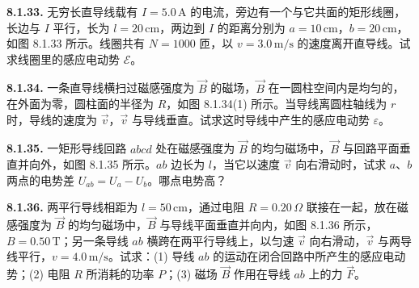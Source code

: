 \begin{center}
\end{center}

\vfill
\newpage

\textbf{8.1.33.} 无穷长直导线载有 $I = 5.0\,\mathrm{A}$ 的电流，旁边有一个与它共面的矩形线圈，长边与 $I$ 平行，长为 $l = 20\,\mathrm{cm}$，两边到 $I$ 的距离分别为 $a = 10\,\mathrm{cm}$，$b = 20\,\mathrm{cm}$，如图 8.1.33 所示。线圈共有 $N = 1000$ 匝，以 $v = 3.0\,\mathrm{m/s}$ 的速度离开直导线。试求线圈里的感应电动势 $\mathcal{E}$。

\begin{center}
\end{center}

\vfill
\newpage

\textbf{8.1.34.} 一条直导线横扫过磁感强度为 $\vec{B}$ 的磁场，$\vec{B}$ 在一圆柱空间内是均匀的，在外面为零，圆柱面的半径为 $R$，如图 8.1.34(1) 所示。当导线离圆柱轴线为 $r$ 时，导线的速度为 $\vec{v}$，$\vec{v}$ 与导线垂直。试求这时导线中产生的感应电动势 $\varepsilon$。

\begin{center}
\end{center}

\vfill
\newpage

\textbf{8.1.35.} 一矩形导线回路 $abcd$ 处在磁感强度为 $\vec{B}$ 的均匀磁场中，$\vec{B}$ 与回路平面垂直并向外，如图 8.1.35 所示。$ab$ 边长为 $l$，当它以速度 $\vec{v}$ 向右滑动时，试求 $a$、$b$ 两点的电势差 $U_{ab} = U_{a} - U_{b}$。哪点电势高？

\begin{center}
\end{center}

\vfill
\newpage

\textbf{8.1.36.} 两平行导线相距为 $l = 50\,\mathrm{cm}$，通过电阻 $R = 0.20\,\Omega$ 联接在一起，放在磁感强度为 $\vec{B}$ 的均匀磁场中，$\vec{B}$ 与导线平面垂直并向内，如图 8.1.36 所示，$B = 0.50\,\mathrm{T}$；另一条导线 $ab$ 横跨在两平行导线上，以匀速 $\vec{v}$ 向右滑动，$\vec{v}$ 与两导线平行，$v = 4.0\,\mathrm{m/s}$。试求：(1) 导线 $ab$ 的运动在闭合回路中所产生的感应电动势；(2) 电阻 $R$ 所消耗的功率 $P$；(3) 磁场 $\vec{B}$ 作用在导线 $ab$ 上的力 $\vec{F}$。

\begin{center}
\end{center}

